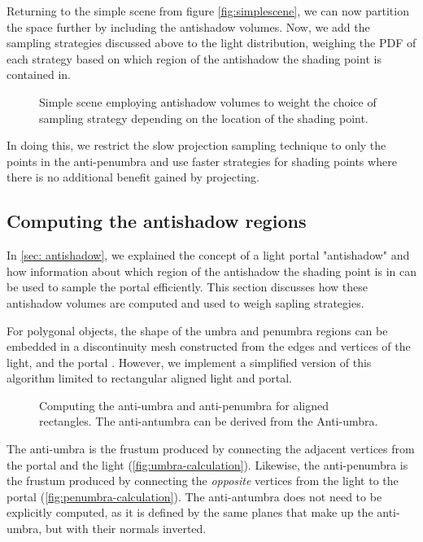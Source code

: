 Returning to the simple scene from figure \autoref{fig:simplescene}, we can now partition the space further by including the antishadow volumes. Now, we add the sampling strategies discussed above to the light distribution, weighing the PDF of each strategy based on which region of the antishadow the shading point is contained in.

\begin{figure}[H]
  \def\svgwidth{0.9\columnwidth}
  
  \label{fig:simplescene-antishadow}
  \caption{Simple scene employing antishadow volumes to weight the choice of sampling strategy depending on the location of the shading point.}
\end{figure}

In doing this, we restrict the slow projection sampling technique to only the points in the anti-penumbra and use faster strategies for shading points where there is no additional benefit gained by projecting.

\subsection{Computing the antishadow regions}

In \autoref{sec: antishadow}, we explained the concept of a light portal "antishadow" and how information about which region of the antishadow the shading point is in can be used to sample the portal efficiently. This section discusses how these antishadow volumes are computed and used to weigh sapling strategies.

For polygonal objects, the shape of the umbra and penumbra regions can be embedded in a discontinuity mesh constructed from the edges and vertices of the light, and the portal \cite*{drettakisFastShadowAlgorithm1994}. However, we implement a simplified version of this algorithm limited to rectangular aligned light and portal. 

\begin{figure}[H]
  \centering
  \caption{Computing the anti-umbra and anti-penumbra for aligned rectangles. The anti-antumbra can be derived from the Anti-umbra.}
\end{figure}

The anti-umbra is the frustum produced by connecting the adjacent vertices from the portal and the light (\autoref{fig:umbra-calculation}). Likewise, the anti-penumbra is the frustum produced by connecting the \emph{opposite} vertices from the light to the portal (\autoref{fig:penumbra-calculation}). The anti-antumbra does not need to be explicitly computed, as it is defined by the same planes that make up the anti-umbra, but with their normals inverted.

